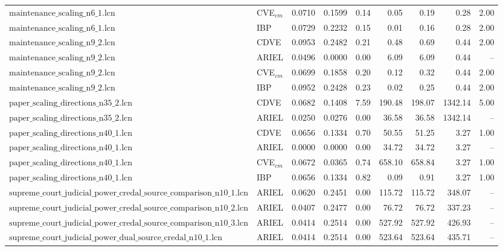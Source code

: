 \begin{table}[ht]
\begin{tabular}{llrrrrrrr}
$\text{maintenance\_scaling\_n6\_1.lcn}$ & CVE$_{cm}$ & 0.0710 & 0.1599 & 0.14 & 0.05 & 0.19 & 0.28 & 2.00 \\
$\text{maintenance\_scaling\_n6\_1.lcn}$ & IBP & 0.0729 & 0.2232 & 0.15 & 0.01 & 0.16 & 0.28 & 2.00 \\
\hline
$\text{maintenance\_scaling\_n9\_2.lcn}$ & CDVE & 0.0953 & 0.2482 & 0.21 & 0.48 & 0.69 & 0.44 & 2.00 \\
$\text{maintenance\_scaling\_n9\_2.lcn}$ & ARIEL & 0.0496 & 0.0000 & 0.00 & 6.09 & 6.09 & 0.44 & -- \\
$\text{maintenance\_scaling\_n9\_2.lcn}$ & CVE$_{cm}$ & 0.0699 & 0.1858 & 0.20 & 0.12 & 0.32 & 0.44 & 2.00 \\
$\text{maintenance\_scaling\_n9\_2.lcn}$ & IBP & 0.0952 & 0.2428 & 0.23 & 0.02 & 0.25 & 0.44 & 2.00 \\
\hline
$\text{paper\_scaling\_directions\_n35\_2.lcn}$ & CDVE & 0.0682 & 0.1408 & 7.59 & 190.48 & 198.07 & 1342.14 & 5.00 \\
$\text{paper\_scaling\_directions\_n35\_2.lcn}$ & ARIEL & 0.0250 & 0.0276 & 0.00 & 36.58 & 36.58 & 1342.14 & -- \\
\hline
$\text{paper\_scaling\_directions\_n40\_1.lcn}$ & CDVE & 0.0656 & 0.1334 & 0.70 & 50.55 & 51.25 & 3.27 & 1.00 \\
$\text{paper\_scaling\_directions\_n40\_1.lcn}$ & ARIEL & 0.0000 & 0.0000 & 0.00 & 34.72 & 34.72 & 3.27 & -- \\
$\text{paper\_scaling\_directions\_n40\_1.lcn}$ & CVE$_{cm}$ & 0.0672 & 0.0365 & 0.74 & 658.10 & 658.84 & 3.27 & 1.00 \\
$\text{paper\_scaling\_directions\_n40\_1.lcn}$ & IBP & 0.0656 & 0.1334 & 0.82 & 0.09 & 0.91 & 3.27 & 1.00 \\
\hline
$\text{supreme\_court\_judicial\_power\_credal\_source\_comparison\_n10\_1.lcn}$ & ARIEL & 0.0620 & 0.2451 & 0.00 & 115.72 & 115.72 & 348.07 & -- \\
\hline
$\text{supreme\_court\_judicial\_power\_credal\_source\_comparison\_n10\_2.lcn}$ & ARIEL & 0.0407 & 0.2477 & 0.00 & 76.72 & 76.72 & 337.23 & -- \\
\hline
$\text{supreme\_court\_judicial\_power\_credal\_source\_comparison\_n10\_3.lcn}$ & ARIEL & 0.0414 & 0.2514 & 0.00 & 527.92 & 527.92 & 426.93 & -- \\
\hline
$\text{supreme\_court\_judicial\_power\_dual\_source\_credal\_n10\_1.lcn}$ & ARIEL & 0.0414 & 0.2514 & 0.00 & 523.64 & 523.64 & 435.71 & -- \\
\hline

\end{tabular}
\end{table}
